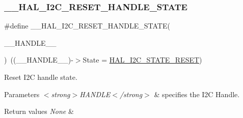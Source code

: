 \subsubsection{\texorpdfstring{\+\_\+\+\_\+\+H\+A\+L\+\_\+\+I2\+C\+\_\+\+R\+E\+S\+E\+T\+\_\+\+H\+A\+N\+D\+L\+E\+\_\+\+S\+T\+A\+TE}{\_\_HAL\_I2C\_RESET\_HANDLE\_STATE}}
{\footnotesize\ttfamily \#define \+\_\+\+\_\+\+H\+A\+L\+\_\+\+I2\+C\+\_\+\+R\+E\+S\+E\+T\+\_\+\+H\+A\+N\+D\+L\+E\+\_\+\+S\+T\+A\+TE(\begin{DoxyParamCaption}\item[{}]{\+\_\+\+\_\+\+H\+A\+N\+D\+L\+E\+\_\+\+\_\+ }\end{DoxyParamCaption})~((\+\_\+\+\_\+\+H\+A\+N\+D\+L\+E\+\_\+\+\_\+)-\/$>$State = \hyperlink{group___h_a_l__state__structure__definition_ggaef355af8eab251ae2a19ee164ad81c37a91ba08634e08d7287940f1bc5a37eeff}{H\+A\+L\+\_\+\+I2\+C\+\_\+\+S\+T\+A\+T\+E\+\_\+\+R\+E\+S\+ET})}



Reset I2C handle state. 


\begin{DoxyParams}{Parameters}
{\em $<$strong$>$\+H\+A\+N\+D\+L\+E$<$/strong$>$} & specifies the I2C Handle. \\
\hline
\end{DoxyParams}

\begin{DoxyRetVals}{Return values}
{\em None} & \\
\hline
\end{DoxyRetVals}
